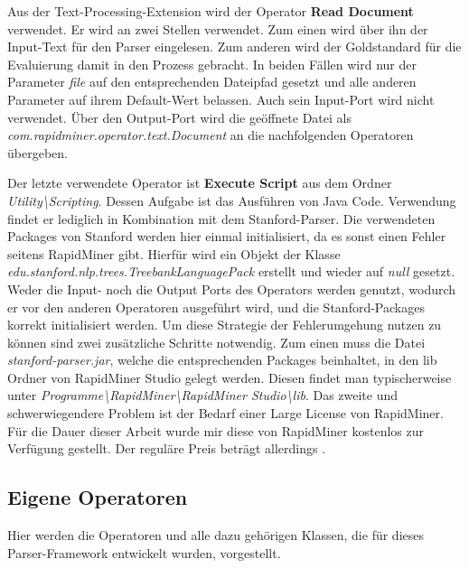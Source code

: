 Aus der Text-Processing-Extension wird der Operator \textbf{Read Document} verwendet. Er wird an zwei Stellen verwendet. Zum einen wird über ihn der Input-Text für den Parser eingelesen. Zum anderen wird der Goldstandard für die Evaluierung damit in den Prozess gebracht. In beiden Fällen wird nur der Parameter \textit{file} auf den entsprechenden Dateipfad gesetzt und alle anderen Parameter auf ihrem Default-Wert belassen. Auch sein Input-Port wird nicht verwendet. Über den Output-Port wird die geöffnete Datei als \textit{com.rapidminer.operator.text.Document} an die nachfolgenden Operatoren übergeben.

Der letzte verwendete Operator ist \textbf{Execute Script} aus dem Ordner \textit{Utility\textbackslash Scripting}. Dessen Aufgabe ist das Ausführen von Java Code. Verwendung findet er lediglich in Kombination mit dem Stanford-Parser. Die verwendeten Packages von Stanford werden hier einmal initialisiert, da es sonst einen Fehler seitens RapidMiner gibt. Hierfür wird ein Objekt der Klasse  \textit{edu.stanford.nlp.trees.TreebankLanguagePack} erstellt und wieder auf \textit{null} gesetzt. Weder die Input- noch die Output Ports des Operators werden genutzt, wodurch er vor den anderen Operatoren ausgeführt wird, und die Stanford-Packages korrekt initialisiert werden. Um diese Strategie der Fehlerumgehung nutzen zu können sind zwei zusätzliche Schritte notwendig. Zum einen muss die Datei \textit{stanford-parser.jar}, welche die entsprechenden Packages beinhaltet, in den lib Ordner von RapidMiner Studio gelegt werden. Diesen findet man typischerweise unter \textit{Programme\textbackslash RapidMiner\textbackslash RapidMiner Studio\textbackslash  lib}. Das zweite und schwerwiegendere Problem ist der Bedarf einer Large License von RapidMiner. Für die Dauer dieser Arbeit wurde mir diese von RapidMiner kostenlos zur Verfügung gestellt. Der reguläre Preis beträgt allerdings %
.

\subsection{Eigene Operatoren}

Hier werden die Operatoren und alle dazu gehörigen Klassen, die für dieses Parser-Framework entwickelt wurden, vorgestellt. 

